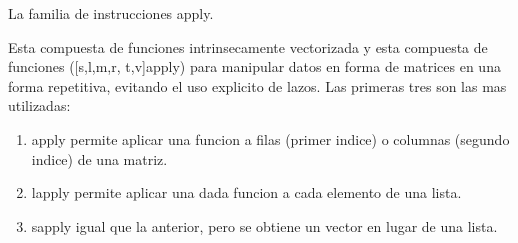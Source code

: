 \documentclass[ignorenonframetext,]{beamer}
\begin{document}
\begin{frame}

\begin{block}{La familia de instrucciones apply.}

Esta compuesta de funciones intrinsecamente vectorizada y esta compuesta
de funciones ({[}s,l,m,r, t,v{]}apply) para manipular datos en forma de
matrices en una forma repetitiva, evitando el uso explicito de lazos.
Las primeras tres son las mas utilizadas:

\begin{enumerate}
\def\labelenumi{\arabic{enumi}.}
\item
  apply permite aplicar una funcion a filas (primer indice) o columnas
  (segundo indice) de una matriz.
\item
  lapply permite aplicar una dada funcion a cada elemento de una lista.
\item
  sapply igual que la anterior, pero se obtiene un vector en lugar de
  una lista.
\end{enumerate}

\end{block}

\end{frame}
\end{document}
